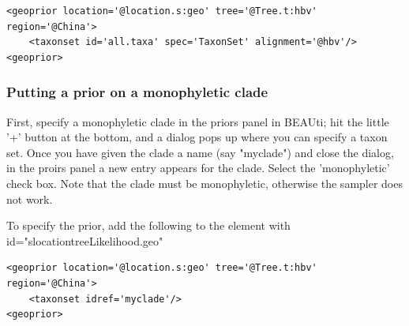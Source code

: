 \documentclass{article}
\begin{document}
\begin{verbatim}
<geoprior location='@location.s:geo' tree='@Tree.t:hbv' region='@China'>
	<taxonset id='all.taxa' spec='TaxonSet' alignment='@hbv'/>
<geoprior>
\end{verbatim}


\subsubsection*{Putting a prior on a monophyletic clade}

First, specify a monophyletic clade in the priors panel in BEAUti; hit the little '+' button at the bottom, and a dialog pops up where you can specify a taxon set. Once you have given the clade a name (say "myclade") and close the dialog, in the proirs panel a new entry appears for the clade. Select the 'monophyletic' check box. Note that the clade must be monophyletic, otherwise the sampler does not work.

To specify the prior, add the following to the element with id="slocationtreeLikelihood.geo"

\begin{verbatim}
<geoprior location='@location.s:geo' tree='@Tree.t:hbv' region='@China'>
	<taxonset idref='myclade'/>
<geoprior>
\end{verbatim}







\end{document}
